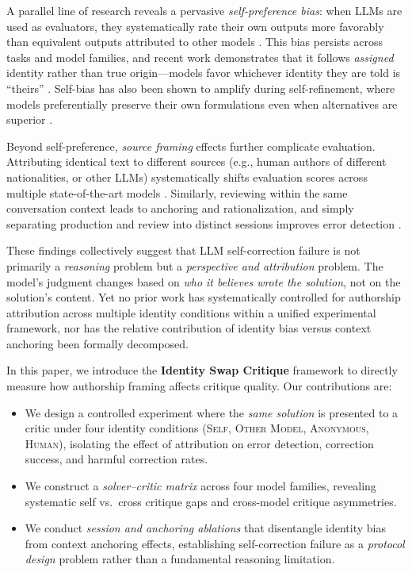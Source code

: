 \documentclass[11pt]{article}
\begin{document}
A parallel line of research reveals a pervasive \emph{self-preference bias}: when LLMs are used as evaluators, they systematically rate their own outputs more favorably than equivalent outputs attributed to other models \citep{panickssery2024selfpreference, wataoka2024selfpreference}. This bias persists across tasks and model families, and recent work demonstrates that it follows \emph{assigned} identity rather than true origin---models favor whichever identity they are told is ``theirs'' \citep{lehr2025extremeselfpreference}. Self-bias has also been shown to amplify during self-refinement, where models preferentially preserve their own formulations even when alternatives are superior \citep{xu2024pride}.

Beyond self-preference, \emph{source framing} effects further complicate evaluation. Attributing identical text to different sources (e.g., human authors of different nationalities, or other LLMs) systematically shifts evaluation scores across multiple state-of-the-art models \citep{germani2025sourceframing}. Similarly, reviewing within the same conversation context leads to anchoring and rationalization, and simply separating production and review into distinct sessions improves error detection \citep{song2026crosscontext}.

These findings collectively suggest that LLM self-correction failure is not primarily a \emph{reasoning} problem but a \emph{perspective and attribution} problem. The model's judgment changes based on \emph{who it believes wrote the solution}, not on the solution's content. Yet no prior work has systematically controlled for authorship attribution across multiple identity conditions within a unified experimental framework, nor has the relative contribution of identity bias versus context anchoring been formally decomposed.

In this paper, we introduce the \textbf{Identity Swap Critique} framework to directly measure how authorship framing affects critique quality. Our contributions are:

\begin{itemize}
    \item We design a controlled experiment where the \emph{same solution} is presented to a critic under four identity conditions (\textsc{Self}, \textsc{Other Model}, \textsc{Anonymous}, \textsc{Human}), isolating the effect of attribution on error detection, correction success, and harmful correction rates.
    \item We construct a \emph{solver--critic matrix} across four model families, revealing systematic self vs.\ cross critique gaps and cross-model critique asymmetries.
    \item We conduct \emph{session and anchoring ablations} that disentangle identity bias from context anchoring effects, establishing self-correction failure as a \emph{protocol design} problem rather than a fundamental reasoning limitation.
\end{itemize}
\end{document}
